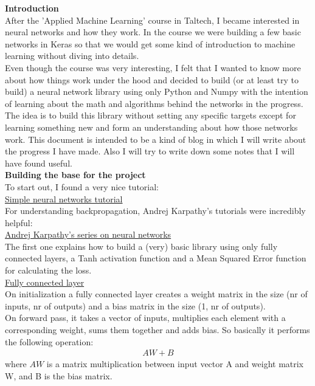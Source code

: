 \documentclass{article}
\begin{document}
\textbf{Introduction} \\

After the 'Applied Machine Learning' course in Taltech, I became interested in
neural networks and how they work. In the course we were building a few basic networks 
in Keras so that we would get some kind of introduction to machine learning without 
diving into details.\\

Even though the course was very interesting, I felt that I wanted to know more about 
how things work under the hood and decided to build (or at least try to build) a neural network library
using only Python and Numpy with the intention of learning about the math and algorithms behind the networks in the
progress.\\

The idea is to build this library without setting any specific targets except for learning
something new and form an understanding about how those networks work. This document is intended 
to be a kind of blog in which I will write about the progress I have made. Also I will try 
to write down some notes that I will have found useful. \\

\textbf{Building the base for the project} \\

To start out, I found a very nice tutorial:\\
\href{https://towardsdatascience.com/math-neural-network-from-scratch-in-python-d6da9f29ce65}{Simple neural networks tutorial} \\
For understanding backpropagation, Andrej Karpathy's tutorials were incredibly helpful: \\
\href{https://www.youtube.com/watch?v=VMj-3S1tku0&list=PLAqhIrjkxbuWI23v9cThsA9GvCAUhRvKZ}{Andrej Karpathy's series on neural networks} \\

The first one explains how to build a (very) basic library using only fully connected
layers, a Tanh activation function and a Mean Squared Error function 
for calculating the loss. \\

\underline{Fully connected layer} \\
On initialization a fully connected layer creates a weight matrix in the size (nr of inputs, nr of outputs) and 
a bias matrix in the size (1, nr of outputs). \\
On forward pass, it takes a vector of inputs, multiplies each element with a corresponding weight, 
sums them together and adds bias. So basically it performs the following operation:
\begin{align*}
    AW + B
\end{align*}
where $AW$ is a matrix multiplication between input vector A and weight matrix W, and B is the bias matrix. \\
\end{document}
